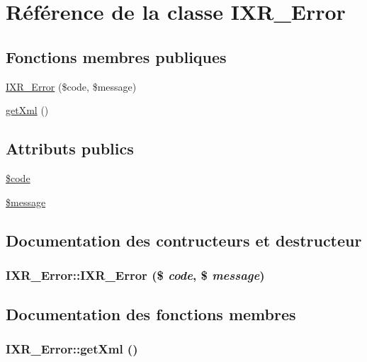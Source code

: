 \hypertarget{classIXR__Error}{
\section{R\'{e}f\'{e}rence de la classe IXR\_\-Error}
\label{classIXR__Error}
}
\subsection*{Fonctions membres publiques}
\begin{CompactItemize}
\item 
\hyperlink{classIXR__Error_a0}{IXR\_\-Error} (\$code, \$message)
\item 
\hyperlink{classIXR__Error_a1}{get\-Xml} ()
\end{CompactItemize}
\subsection*{Attributs publics}
\begin{CompactItemize}
\item 
\hyperlink{classIXR__Error_o0}{\$code}
\item 
\hyperlink{classIXR__Error_o1}{\$message}
\end{CompactItemize}


\subsection{Documentation des contructeurs et destructeur}
\hypertarget{classIXR__Error_a0}{
\subsubsection[IXR\_\-Error]{\setlength{\rightskip}{0pt plus 5cm}IXR\_\-Error::IXR\_\-Error (\$ {\em code}, \$ {\em message})}}
\label{classIXR__Error_a0}




\subsection{Documentation des fonctions membres}
\hypertarget{classIXR__Error_a1}{
\subsubsection[getXml]{\setlength{\rightskip}{0pt plus 5cm}IXR\_\-Error::get\-Xml ()}}
\label{classIXR__Error_a1}




